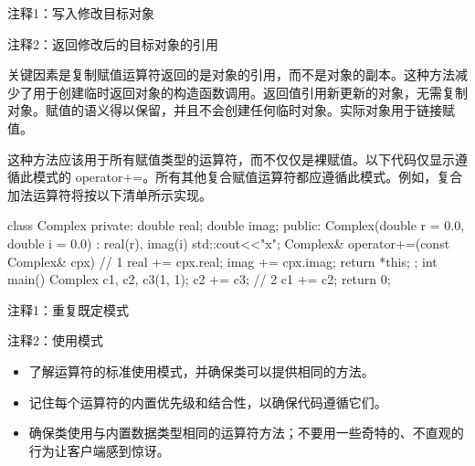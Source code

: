 {\footnotesize
注释1：写入修改目标对象

注释2：返回修改后的目标对象的引用
}

关键因素是复制赋值运算符返回的是对象的引用，而不是对象的副本。这种方法减少了用于创建临时返回对象的构造函数调用。返回值引用新更新的对象，无需复制对象。赋值的语义得以保留，并且不会创建任何临时对象。实际对象用于链接赋值。

这种方法应该用于所有赋值类型的运算符，而不仅仅是裸赋值。以下代码仅显示遵循此模式的 operator+=。所有其他复合赋值运算符都应遵循此模式。例如，复合加法运算符将按以下清单所示实现。


\begin{cpp}
class Complex {
private:
  double real;
  double imag;
public:
  Complex(double r = 0.0, double i = 0.0) :
  real(r), imag(i) {std::cout<<"x\n";}
  Complex& operator+=(const Complex& cpx) { // 1
    real += cpx.real;
    imag += cpx.imag;
    return *this;
  }
};
int main() {
  Complex c1, c2, c3(1, 1);
  c2 += c3; // 2
  c1 += c2;
  return 0;
}
\end{cpp}

{\footnotesize
注释1：重复既定模式

注释2：使用模式
}


\begin{itemize}
\item
了解运算符的标准使用模式，并确保类可以提供相同的方法。

\item
记住每个运算符的内置优先级和结合性，以确保代码遵循它们。

\item
确保类使用与内置数据类型相同的运算符方法；不要用一些奇特的、不直观的行为让客户端感到惊讶。
\end{itemize}
